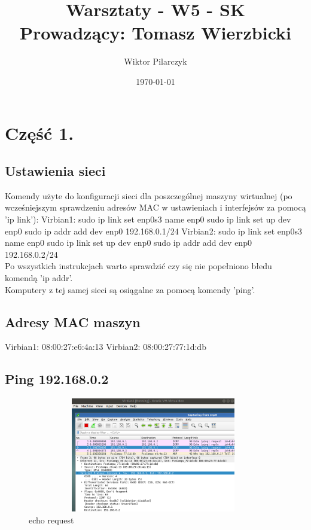 \documentclass{article}
\author{Wiktor Pilarczyk}
\title{Warsztaty - W5 - SK\\\large{Prowadzący: Tomasz Wierzbicki}}
\date{\today}
\begin{document}
\maketitle
\section{Część 1.}
\subsection{Ustawienia sieci}
Komendy użyte do konfiguracji sieci dla poszczególnej maszyny wirtualnej (po wcześniejszym sprawdzeniu adresów MAC w ustawieniach i interfejsów za pomocą 'ip link'):
\tabto{0.4cm}Virbian1:
\tabto{0.8cm}    sudo ip link set enp0s3 name enp0
\tabto{0.8cm}    sudo ip link set up dev enp0
\tabto{0.8cm}    sudo ip addr add dev enp0 192.168.0.1/24
\tabto{0.4cm}Virbian2:
\tabto{0.8cm}    sudo ip link set enp0s3 name enp0
\tabto{0.8cm}    sudo ip link set up dev enp0
\tabto{0.8cm}    sudo ip addr add dev enp0 192.168.0.2/24
\\
Po wszystkich instrukcjach warto sprawdzić czy się nie popełniono błedu komendą 'ip addr'.
\\
Komputery z tej samej sieci są osiągalne za pomocą komendy 'ping'.
\subsection{Adresy MAC maszyn}
\tabto{0.4cm}Virbian1:
\tabto{0.8cm}    08:00:27:e6:4a:13
\tabto{0.4cm}Virbian2:
\tabto{0.8cm}    08:00:27:77:1d:db
\\
\subsection{Ping 192.168.0.2}

\begin{figure}[!htb]
\centering
\includegraphics[width=11cm,height=5cm]{broadreq.png}
\caption{echo request}
\end{figure}
\end{document}
